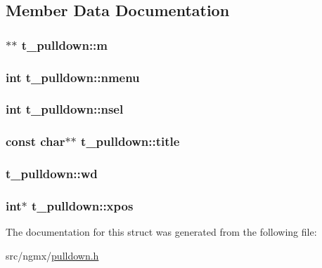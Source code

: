 \subsection{\-Member \-Data \-Documentation}
\hypertarget{structt__pulldown_a1010909c723a4d9cfc8bf2c83afcf4b2}{
\subsubsection[{m}]{$\ast$$\ast$ {\bf t\-\_\-pulldown\-::m}}}\label{structt__pulldown_a1010909c723a4d9cfc8bf2c83afcf4b2}
\hypertarget{structt__pulldown_af85e79851a77e094bd037a0a3bdc2701}{
\subsubsection[{nmenu}]{\setlength{\rightskip}{0pt plus 5cm}int {\bf t\-\_\-pulldown\-::nmenu}}}\label{structt__pulldown_af85e79851a77e094bd037a0a3bdc2701}
\hypertarget{structt__pulldown_aed4fe57ed6793b00bd7e72afa5dc8078}{
\subsubsection[{nsel}]{\setlength{\rightskip}{0pt plus 5cm}int {\bf t\-\_\-pulldown\-::nsel}}}\label{structt__pulldown_aed4fe57ed6793b00bd7e72afa5dc8078}
\hypertarget{structt__pulldown_ace380adf9cd9773e993f7ece6db5547a}{
\subsubsection[{title}]{\setlength{\rightskip}{0pt plus 5cm}const char$\ast$$\ast$ {\bf t\-\_\-pulldown\-::title}}}\label{structt__pulldown_ace380adf9cd9773e993f7ece6db5547a}
\hypertarget{structt__pulldown_aac01816fa249ef0cea5c871ba65a89d6}{
\subsubsection[{wd}]{ {\bf t\-\_\-pulldown\-::wd}}}\label{structt__pulldown_aac01816fa249ef0cea5c871ba65a89d6}
\hypertarget{structt__pulldown_a4eebb0122cb0248582ac42ded2ec33e1}{
\subsubsection[{xpos}]{\setlength{\rightskip}{0pt plus 5cm}int$\ast$ {\bf t\-\_\-pulldown\-::xpos}}}\label{structt__pulldown_a4eebb0122cb0248582ac42ded2ec33e1}


\-The documentation for this struct was generated from the following file\-:\begin{DoxyCompactItemize}
\item 
src/ngmx/\hyperlink{pulldown_8h}{pulldown.\-h}\end{DoxyCompactItemize}
